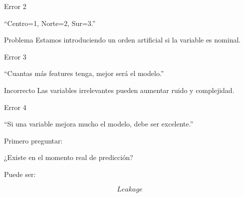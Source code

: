 \documentclass[aspectratio=169,11pt]{beamer}
\begin{document}

\begin{frame}{Error 2}

\begin{center}

\Large
``Centro=1, Norte=2, Sur=3.''
\end{center}

\vspace{0.5cm}

\begin{alertblock}{Problema}
Estamos introduciendo un orden artificial
si la variable es nominal.
\end{alertblock}

\end{frame}


\begin{frame}{Error 3}

\begin{center}

\Large
``Cuantas más features tenga,
mejor será el modelo.''
\end{center}

\vspace{0.5cm}

\begin{alertblock}{Incorrecto}
Las variables irrelevantes pueden aumentar ruido y complejidad.
\end{alertblock}

\end{frame}


\begin{frame}{Error 4}

\begin{center}

\Large
``Si una variable mejora mucho el modelo,
debe ser excelente.''
\end{center}

\vspace{0.5cm}

Primero preguntar:

\begin{center}

¿Existe en el momento real de predicción?
\end{center}

Puede ser:

\[
\boxed{
Leakage
}
\]

\end{frame}
\end{document}
